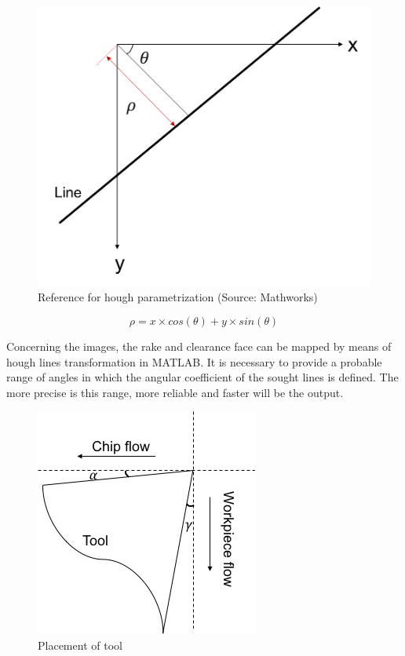 			\begin{figure}[H]
				\centering
				\captionsetup{justification=centering}
				\includegraphics[scale = 0.5]{Imagens/houghp.png}
				\caption{Reference for hough parametrization (Source: Mathworks)}
				\label{fig:houghp}
			\end{figure}

			\begin{equation} 
			\label{eq_parametric}
			\rho = x\times cos(\theta) + y\times sin(\theta)
			\end{equation}

			Concerning the images, the rake and clearance face can be mapped by means of hough lines transformation in MATLAB. It is necessary to provide a probable range of angles in which the angular coefficient of the sought lines is defined. The more precise is this range, more reliable and faster will be the output.			

			\begin{figure}[H]
				\centering
				\captionsetup{justification=centering}
				\includegraphics[scale = 0.65]{Cap4/imgset.jpg}
				\caption{Placement of tool}
				\label{fig:imgset}
			\end{figure}

